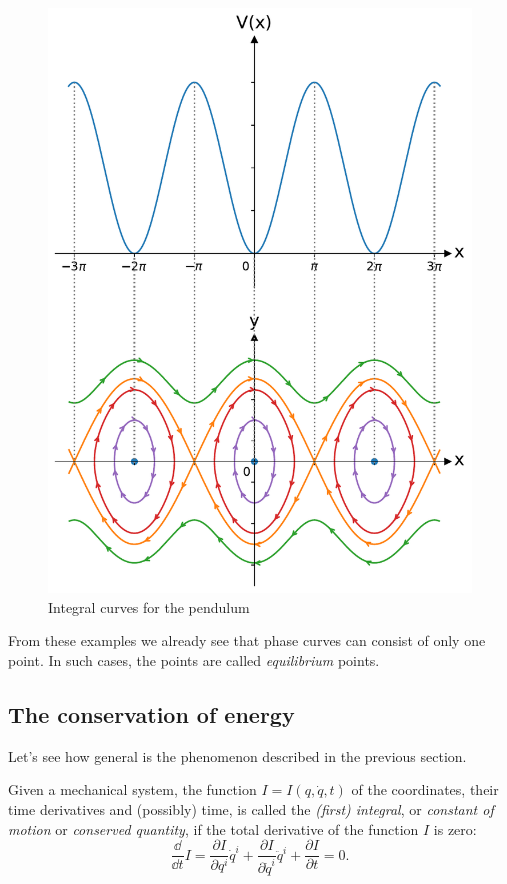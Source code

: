 \documentclass[english,fontsize=11pt,paper=b5]{scrbook}
\theoremstyle{definition}
\begin{document}
    \begin{figure}[htbp]
      \centering
      \includegraphics[width=.7\linewidth]{images/potential-curves-pendulum.pdf}
      \caption{Integral curves for the pendulum}
      \label{fig:pendulum}
    \end{figure}

    From these examples we already see that phase curves can consist of only one point. In such cases, the points are called \emph{equilibrium} points.

    \subsection{The conservation of energy}\label{sec:energy}

    Let's see how general is the phenomenon described in the previous section.

    \begin{tcolorbox}
      Given a mechanical system, the function $I = I(q, \dot q, t)$ of the coordinates, their time derivatives and (possibly) time, is called the \emph{(first) integral}, or \emph{constant of motion} or \emph{conserved quantity}, if the total derivative of the function $I$ is zero:
      \begin{equation}\label{eq:firstintegralD}
        \frac{\dd}{\dd t}I =
        \frac{\partial I}{\partial q^i} \dot q^i +
        \frac{\partial I}{\partial \dot q^i} \ddot q^i +
        \frac{\partial I}{\partial t}
        = 0.
      \end{equation}
    \end{tcolorbox}
\end{document}
